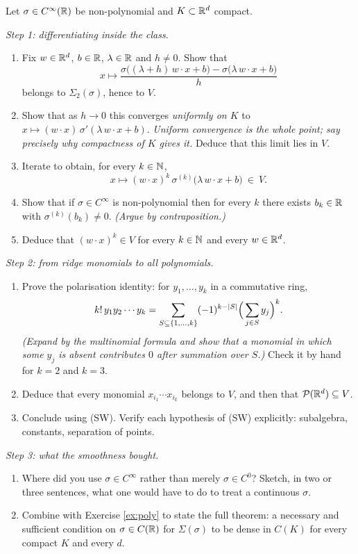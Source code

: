 \documentclass[11pt,a4paper]{article}
\begin{document}
\begin{exercise}\label{ex:llps}
Let $\sigma \in C^\infty(\mathbb{R})$ be non-polynomial and $K \subset \mathbb{R}^d$ compact.

\medskip
\noindent\emph{Step 1: differentiating inside the class.}
\begin{enumerate}[label=\textbf{\arabic*.}]
\item Fix $w \in \mathbb{R}^d$, $b \in \mathbb{R}$, $\lambda \in \mathbb{R}$ and $h \ne 0$. Show that
\[
x \longmapsto \frac{\sigma\big((\lambda+h)\,w\cdot x + b\big) - \sigma\big(\lambda\,w\cdot x + b\big)}{h}
\]
belongs to $\Sigma_2(\sigma)$, hence to $V$.
\item Show that as $h \to 0$ this converges \emph{uniformly on $K$} to
$x \mapsto (w\cdot x)\,\sigma'(\lambda\,w\cdot x + b)$. \emph{Uniform convergence is the whole
point; say precisely why compactness of $K$ gives it.} Deduce that this limit lies in $V$.
\item Iterate to obtain, for every $k \in \mathbb{N}$,
\[
x \longmapsto (w\cdot x)^k\, \sigma^{(k)}\big(\lambda\, w\cdot x + b\big) \ \in\ V .
\]
\item Show that if $\sigma \in C^\infty$ is non-polynomial then for every $k$ there exists
$b_k \in \mathbb{R}$ with $\sigma^{(k)}(b_k) \ne 0$. \emph{(Argue by contraposition.)}
\item Deduce that $(w\cdot x)^k \in V$ for every $k \in \mathbb{N}$ and every $w \in \mathbb{R}^d$.
\end{enumerate}

\medskip
\noindent\emph{Step 2: from ridge monomials to all polynomials.}
\begin{enumerate}[label=\textbf{\arabic*.}, resume]
\item Prove the polarisation identity: for $y_1,\dots,y_k$ in a commutative ring,
\[
k!\, y_1 y_2\cdots y_k = \sum_{S \subseteq \{1,\dots,k\}} (-1)^{k-\left\lvert S \right\rvert}\Big(\sum_{j\in S} y_j\Big)^{k}.
\]
\emph{(Expand by the multinomial formula and show that a monomial in which some $y_j$ is absent
contributes $0$ after summation over $S$.)} Check it by hand for $k = 2$ and $k=3$.
\item Deduce that every monomial $x_{i_1}\cdots x_{i_k}$ belongs to $V$, and then that
$\mathcal{P}(\mathbb{R}^d)\subseteq V$.
\item Conclude using \textup{(SW)}. Verify each hypothesis of \textup{(SW)} explicitly: subalgebra,
constants, separation of points.
\end{enumerate}

\medskip
\noindent\emph{Step 3: what the smoothness bought.}
\begin{enumerate}[label=\textbf{\arabic*.}, resume]
\item Where did you use $\sigma \in C^\infty$ rather than merely $\sigma \in C^0$? Sketch, in two or
three sentences, what one would have to do to treat a continuous $\sigma$.
\item Combine with Exercise \ref{ex:poly} to state the full theorem: a necessary and sufficient
condition on $\sigma \in C(\mathbb{R})$ for $\Sigma(\sigma)$ to be dense in $C(K)$ for every compact $K$ and
every $d$.
\end{enumerate}
\end{exercise}
\end{document}
